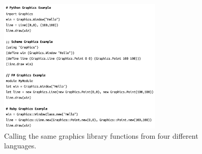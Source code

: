 \documentclass[acmsmall,screen,authorversion]{acmart}
\begin{document}
\begin{figure}
  \includegraphics[width=0.7\textwidth]{graphics-scripts.jpg}
  \caption{Calling the same graphics library functions from four different languages.}
  \label{fig:scripts}
  \Description{}
\end{figure}

\end{document}
